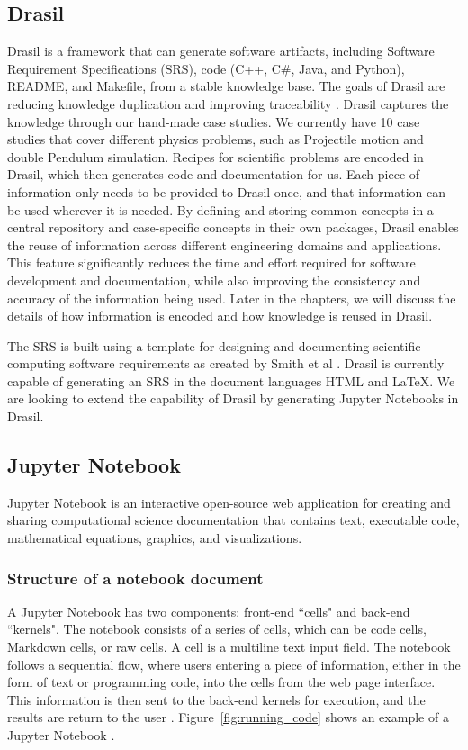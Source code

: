 \subsection{Drasil} \label{chap:intro_drasil}
Drasil is a framework that can generate software artifacts, including Software 
Requirement Specifications (SRS), code (C++, C\#, Java, and Python), README, 
and Makefile, from a stable knowledge base. The goals of Drasil are reducing 
knowledge duplication and improving traceability \cite{drasil}. Drasil captures 
the knowledge through our hand-made case studies. We currently have 10 case 
studies that cover different physics problems, such as Projectile motion and 
double Pendulum simulation. Recipes for scientific problems are encoded in 
Drasil, which then generates code and documentation for us. Each piece of 
information only needs to be provided to Drasil once, and that information can 
be used wherever it is needed. By defining and storing common concepts in a 
central repository and case-specific concepts in their own packages, Drasil 
enables the reuse of information across different engineering domains and 
applications. This feature significantly reduces the time and effort required 
for software development and documentation, while also improving the 
consistency and accuracy of the information being used. Later in the chapters, 
we will discuss the details of how information is encoded and how knowledge is 
reused in Drasil.

The SRS is built using a template for designing and documenting scientific 
computing software requirements as created by Smith et al \cite{smith2005new}. 
Drasil is currently capable of generating an SRS in the document languages HTML 
and LaTeX. We are looking to extend the capability of Drasil by generating 
Jupyter Notebooks in Drasil.

\subsection{Jupyter Notebook} \label{chap:intro_notebook}
Jupyter Notebook is an interactive open-source web application for creating and 
sharing computational science documentation that contains text, executable 
code, mathematical equations, graphics, and visualizations.

\subsubsection{Structure of a notebook document}
A Jupyter Notebook has two components: front-end ``cells" and back-end 
``kernels". The notebook consists of a series of cells, which can be code 
cells, Markdown cells, or raw cells. A cell is a multiline text input field. 
The notebook follows a sequential flow, where users entering a piece of 
information, either in the form of text or programming code, into the cells 
from the web page interface. This information is then sent to the back-end 
kernels for execution, and the results are return to the user 
\cite{notebookdoc}. Figure~\ref{fig:running_code} shows an example of a
Jupyter Notebook \cite{jupyternotebookrep}.

